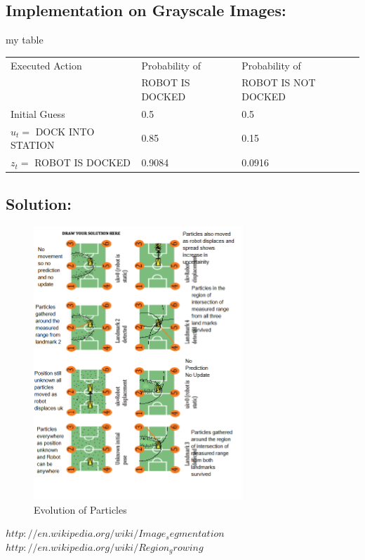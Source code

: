 \documentclass{article}
\begin{document}
\subsection{Implementation on Grayscale Images:}

my table\\
\begin{table}[h]
    \begin{tabular}{|l|l|l|}
    \hline
    Executed Action       & Probability of                   & Probability of \\ 
                          & ROBOT IS DOCKED                   & ROBOT IS NOT DOCKED \\ \hline
    Initial Guess         & 0.5                                & 0.5                                    \\ \hline
    $u_{t}=$ DOCK INTO STATION & 0.85                                & 0.15                                    \\ \hline
    $z_{t} =$ ROBOT IS DOCKED  & 0.9084                                & 0.0916                                    \\ \hline
    \end{tabular}
\end{table}
\subsection{Solution:}

\begin{figure}[H]  
\includegraphics[width=0.7\textwidth]{solution2.png}

\label{Solution22}
\caption{Evolution of Particles}
\end{figure}
\begin{thebibliography}{9}
$http://en.wikipedia.org/wiki/Image_segmentation$
$http://en.wikipedia.org/wiki/Region_growing$
\end{thebibliography}
\end{document}
